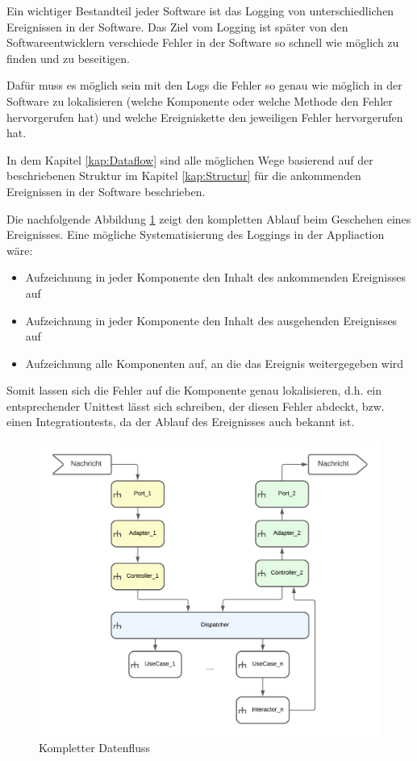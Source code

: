 Ein wichtiger Bestandteil jeder Software ist das Logging von unterschiedlichen Ereignissen in der Software.
Das Ziel vom Logging ist später von den Softwareentwicklern verschiede Fehler in der Software so schnell wie möglich zu finden und
zu beseitigen.

Dafür muss es möglich sein mit den Logs die Fehler so genau wie möglich in der Software zu lokalisieren 
(welche Komponente oder welche Methode den Fehler hervorgerufen hat) 
und welche Ereigniskette den jeweiligen Fehler hervorgerufen hat.

In dem Kapitel \ref{kap:Dataflow} sind alle möglichen Wege basierend auf der beschriebenen Struktur 
im Kapitel \ref{kap:Structur} für die ankommenden Ereignissen in der Software beschrieben.

Die nachfolgende Abbildung \ref{fig:FullDataFlow} zeigt den kompletten Ablauf beim Geschehen eines Ereignisses.
Eine mögliche Systematisierung des Loggings in der Appliaction wäre: 
\begin{itemize}
    \item Aufzeichnung in jeder Komponente den Inhalt des ankommenden Ereignisses auf
    \item Aufzeichnung in jeder Komponente den Inhalt des ausgehenden Ereignisses auf
    \item Aufzeichnung alle Komponenten auf, an die das Ereignis weitergegeben wird
\end{itemize}

Somit lassen sich die Fehler auf die Komponente genau lokalisieren, d.h. ein entsprechender Unittest lässt sich schreiben, 
der diesen Fehler abdeckt, bzw. einen Integrationtests, da der Ablauf des Ereignisses auch bekannt ist.

\begin{figure}[H]
    \centering
    \includegraphics[width=12cm]{./images/FullDataFlow.png}
     \caption[Kompletter Datenfluss]{Kompletter Datenfluss}
     \label{fig:FullDataFlow}
\end{figure}
